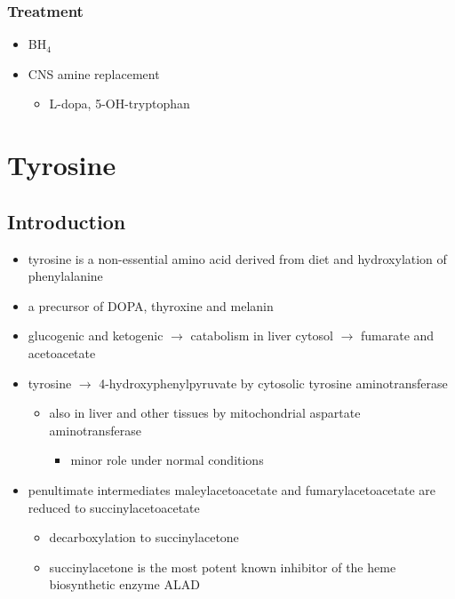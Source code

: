 \documentclass{scrartcl}
\begin{document}
\subsubsection{Treatment}
\label{sec:org0e1687d}
\begin{itemize}
\item BH\(_{\text{4}}\)
\item CNS amine replacement
\begin{itemize}
\item L-dopa, 5-OH-tryptophan
\end{itemize}
\end{itemize}

\section{Tyrosine}
\label{sec:org295c3ad}
\subsection{Introduction}
\label{sec:org8d39d08}
\begin{itemize}
\item tyrosine is a non-essential amino acid derived from diet and hydroxylation of phenylalanine
\item a precursor of DOPA, thyroxine and melanin
\item glucogenic and ketogenic \(\to\) catabolism in liver cytosol \(\to\) fumarate and acetoacetate
\item tyrosine \(\to\) 4-hydroxyphenylpyruvate by cytosolic tyrosine aminotransferase
\begin{itemize}
\item also in liver and other tissues by mitochondrial aspartate aminotransferase
\begin{itemize}
\item minor role under normal conditions
\end{itemize}
\end{itemize}
\item penultimate intermediates maleylacetoacetate and fumarylacetoacetate
are reduced to succinylacetoacetate
\begin{itemize}
\item decarboxylation to succinylacetone
\item succinylacetone is the most potent known inhibitor of the heme biosynthetic enzyme ALAD
\end{itemize}
\end{itemize}
\end{document}
